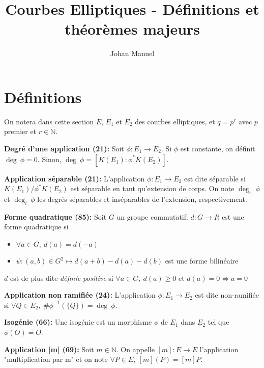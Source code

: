 \documentclass[a4paper,11pt]{article}
\title{Courbes Elliptiques - Définitions et théorèmes majeurs}
\author{Johan Manuel}
\begin{document}
\shorthandoff{:}

\maketitle

\section{Définitions}

On notera dans cette section $E$, $E_1$ et $E_2$ des courbes elliptiques, et $q = p^r$ avec $p$ premier
et $r \in \mathbb{N}$.
\vspace{5mm}

\textbf{Degré d'une application (21):} Soit $\phi: E_1 \to E_2$. Si $\phi$ est constante, on définit
  $\deg~ \phi = 0$. Sinon, $\deg~ \phi = [K(E_1) : \phi^*K(E_2)]$.
\vspace{5mm}

\textbf{Application séparable (21):} L'application $\phi: E_1 \to E_2$ est dite séparable si \newline
  $K(E_1)/\phi^*K(E_2)$ est
  séparable en tant qu'extension de corps. On note $\deg_s~ \phi$ et $\deg_i~ \phi$ les degrés séparables et
  inséparables de l'extension, respectivement.
\vspace{5mm}

\textbf{Forme quadratique (85):} Soit $G$ un groupe commutatif. $d: G \to R$ est une forme quadratique si
  \begin{itemize}
    \item $\forall a \in G,~ d(a) = d(-a)$
    \item $\psi: (a, b) \in G^2 \mapsto d(a+b) - d(a) - d(b)$ est une forme bilinéaire
  \end{itemize}
  $d$ est de plus dite \textit{définie positive} si $\forall a \in G,~ d(a) \geq 0$ et
  $d(a) = 0 \Leftrightarrow a = 0$
\vspace{5mm}

\textbf{Application non ramifiée (24):} L'application $\phi: E_1 \to E_2$ est dite non-ramifiée si \newline
  $\forall Q \in E_2,~ \#\phi^{-1}(\{Q\}) = \deg~ \phi.$
\vspace{5mm}

\textbf{Isogénie (66):} Une isogénie est un morphisme $\phi$ de $E_1$ dans $E_2$ tel que $\phi(O) = O$.
\vspace{5mm}

\textbf{Application [m] (69):} Soit $m \in \mathbb{N}$. On appelle $[m]: E \to E$ l'application "multiplication par m" et on note
  $\forall P \in E,~ [m](P) = [m]P$.
\vspace{5mm}
\end{document}
